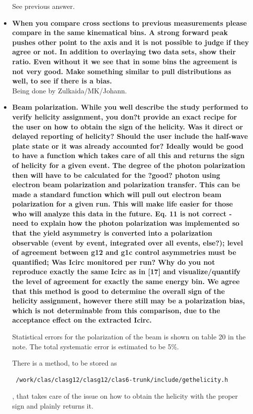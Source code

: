 \documentclass[ 12 pt]{article}
\begin{document}
\begin{itemize}
See previous answer.


\item \textbf{When you compare cross sections to previous measurements please 
compare in the same kinematical bins. A strong forward peak pushes other 
point to the axis and it is not possible to judge if they agree or not. In addition 
to overlaying two data sets, show their ratio. Even without it we see that in 
some bins the agreement is not very good. Make something similar to pull 
distributions as well, to see if there is a bias.}\\

Being done by Zulkaida/MK/Johann.


\item \textbf{Beam polarization. While you well describe the study performed to verify
helicity assignment, you don?t provide an exact recipe for the user on how to
obtain the sign of the helicity. Was it direct or delayed reporting of helicity?
Should the user include the half-wave plate state or it was already accounted
for? Ideally would be good to have a function which takes care of all this and
returns the sign of helicity for a given event. The degree of the photon
polarization then will have to be calculated for the ?good? photon using
electron beam polarization and polarization transfer. This can be made a
standard function which will pull out electron beam polarization for a given
run. This will make life easier for those who will analyze this data in the
future. Eq. 11 is not correct - need to explain how the photon polarization
was implemented so that the yield asymmetry is converted into a
polarization observable (event by event, integrated over all events, else?);
level of agreement between g12 and g1c control asymmetries must be
quantified; Was Icirc monitored per run? Why do you not reproduce exactly
the same Icirc as in [17] and visualize/quantify the level of agreement for
exactly the same energy bin. We agree that this method is good to determine
the overall sign of the helicity assignment, however there still may be a
polarization bias, which is not determinable from this comparison, due to the
acceptance effect on the extracted Icirc.}



Statistical errors for the polarization of the beam is shown on table 20 in the note. The total systematic error is estimated to be 5\%.

There is a method, to be stored as \begin{verbatim} /work/clas/clasg12/clasg12/clas6-trunk/include/gethelicity.h \end{verbatim}, 
that takes care of the issue on how to obtain the helicity with the proper sign and plainly returns it.



\end{itemize}
\end{document}
